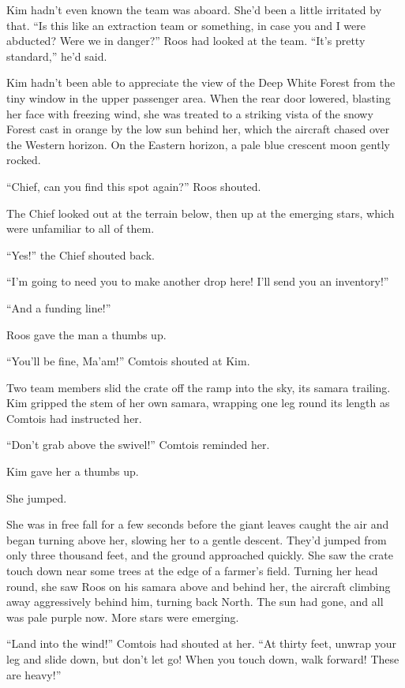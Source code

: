 \documentclass[11pt,a5paper]{article}
\begin{document}
Kim hadn't even known the team was aboard. She'd been a little irritated by that. ``Is this like an extraction team or something, in case you and I were abducted? Were we in danger?'' Roos had looked at the team. ``It's pretty standard,'' he'd said.

Kim hadn't been able to appreciate the view of the Deep White Forest from the tiny window in the upper passenger area. When the rear door lowered, blasting her face with freezing wind, she was treated to a striking vista of the snowy Forest cast in orange by the low sun behind her, which the aircraft chased over the Western horizon. On the Eastern horizon, a pale blue crescent moon gently rocked.

``Chief, can you find this spot again?'' Roos shouted.

The Chief looked out at the terrain below, then up at the emerging stars, which were unfamiliar to all of them.

``Yes!'' the Chief shouted back.

``I'm going to need you to make another drop here! I'll send you an inventory!''

``And a funding line!''

Roos gave the man a thumbs up.

``You'll be fine, Ma'am!'' Comtois shouted at Kim.

Two team members slid the crate off the ramp into the sky, its samara trailing. Kim gripped the stem of her own samara, wrapping one leg round its length as Comtois had instructed her.

``Don't grab above the swivel!'' Comtois reminded her.

Kim gave her a thumbs up.

She jumped.

She was in free fall for a few seconds before the giant leaves caught the air and began turning above her, slowing her to a gentle descent. They'd jumped from only three thousand feet, and the ground approached quickly. She saw the crate touch down near some trees at the edge of a farmer's field. Turning her head round, she saw Roos on his samara above and behind her, the aircraft climbing away aggressively behind him, turning back North. The sun had gone, and all was pale purple now. More stars were emerging.

``Land into the wind!'' Comtois had shouted at her. ``At thirty feet, unwrap your leg and slide down, but don't let go! When you touch down, walk forward! These are heavy!''
\end{document}
